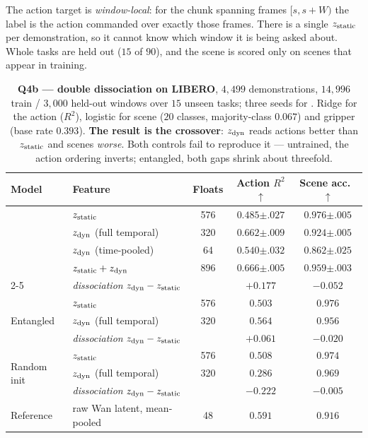 The action target is \emph{window-local}: for the chunk spanning frames $[s,s{+}W)$ the
label is the action commanded over exactly those frames. There is a single $z_{\mathrm{static}}$ per
demonstration, so it cannot know which window it is being asked about. Whole tasks are
held out ($15$ of $90$), and the scene is scored only on scenes that appear in training.

\begin{table}[t]
\centering\small
\caption{\textbf{Q4b --- double dissociation on LIBERO}, $4{,}499$ demonstrations,
$14{,}996$ train / $3{,}000$ held-out windows over $15$ unseen tasks; three seeds for
\method{}. Ridge for the action ($R^2$), logistic for scene ($20$ classes,
majority-class $0.067$) and gripper (base rate $0.393$). \textbf{The result is the
crossover}: $z_{\mathrm{dyn}}$ reads actions better than $z_{\mathrm{static}}$ and scenes \emph{worse}. Both controls
fail to reproduce it --- untrained, the action ordering inverts; entangled, both gaps
shrink about threefold.}
\label{tab:libero}
\begin{tabular}{llccc}
\toprule
Model & Feature & Floats & Action $R^2$ $\uparrow$ & Scene acc.\ $\uparrow$ \\
\midrule
\multirow{4}{*}{\method{}}
 & $z_{\mathrm{static}}$                 & 576 & $0.485${\tiny$\pm.027$} & $\mathbf{0.976}${\tiny$\pm.005$} \\
 & $z_{\mathrm{dyn}}$ (full temporal) & 320 & $\mathbf{0.662}${\tiny$\pm.009$} & $0.924${\tiny$\pm.005$} \\
 & $z_{\mathrm{dyn}}$ (time-pooled)   & 64  & $0.540${\tiny$\pm.032$} & $0.862${\tiny$\pm.025$} \\
 & $z_{\mathrm{static}} + z_{\mathrm{dyn}}$           & 896 & $0.666${\tiny$\pm.005$} & $0.959${\tiny$\pm.003$} \\
\cmidrule(l){2-5}
 & \emph{dissociation} $z_{\mathrm{dyn}}-z_{\mathrm{static}}$ & & $\mathbf{+0.177}$ & $\mathbf{-0.052}$ \\
\midrule
\multirow{3}{*}{Entangled}
 & $z_{\mathrm{static}}$                 & 576 & $0.503$ & $0.976$ \\
 & $z_{\mathrm{dyn}}$ (full temporal) & 320 & $0.564$ & $0.956$ \\
\cmidrule(l){2-5}
 & \emph{dissociation} $z_{\mathrm{dyn}}-z_{\mathrm{static}}$ & & $+0.061$ & $-0.020$ \\
\midrule
\multirow{3}{*}{Random init}
 & $z_{\mathrm{static}}$                 & 576 & $0.508$ & $0.974$ \\
 & $z_{\mathrm{dyn}}$ (full temporal) & 320 & $0.286$ & $0.969$ \\
\cmidrule(l){2-5}
 & \emph{dissociation} $z_{\mathrm{dyn}}-z_{\mathrm{static}}$ & & $-0.222$ & $-0.005$ \\
\midrule
Reference & raw Wan latent, mean-pooled & 48 & $0.591$ & $0.916$ \\
\bottomrule
\end{tabular}
\end{table}


